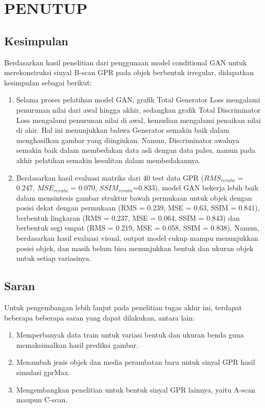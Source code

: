 \chapter{PENUTUP}
\label{chap:penutup}


\section{Kesimpulan}
\label{sec:kesimpulan}

Berdasarkan hasil penelitian dari penggunaan model conditional GAN untuk merekonstruksi sinyal B-scan GPR pada objek berbentuk irregular, didapatkan kesimpulan sebagai berikut:

\begin{enumerate}[nolistsep]

  \item Selama proses pelatihan model GAN, grafik Total Generator Loss mengalami penurunan nilai dari awal hingga akhir, sedangkan grafik Total Discriminator Loss mengalami penurunan nilai di awal, kemudian mengalami penaikan nilai di ahir. 
  Hal ini menunjukkan bahwa Generator semakin baik dalam menghasilkan gambar yang diinginkan. Namun, Discriminator awalnya semakin baik dalam membedakan data asli dengan data palsu, namun pada akhir pelatihan semakin kesulitan dalam membedakannya.

  \item Berdasarkan hasil evaluasi matriks dari 40 test data GPR ($RMS_{rerata}$ = 0.247, $MSE_{rerata}$ = 0.070, $SSIM_{rerata}$=0.833), model GAN bekerja lebih baik dalam mensintesis gambar struktur bawah permukaan untuk objek dengan posisi dekat dengan permukaan (RMS = 0.239, MSE = 0.63, SSIM = 0.841), berbentuk lingkaran (RMS = 0.237, MSE = 0.064, SSIM = 0.843) dan berbentuk segi empat (RMS = 0.219, MSE = 0.058, SSIM = 0.838).
  Namun, berdasarkan hasil evaluasi visual, output model cukup mampu menunjukkan posisi objek, dan masih belum bisa menunjukkan bentuk dan ukuran objek untuk setiap variasinya.

\end{enumerate}

\section{Saran}
\label{chap:saran}

Untuk pengembangan lebih lanjut pada penelitian tugas akhir ini, terdapat beberapa beberapa saran yang dapat dilakukan, antara lain:

\begin{enumerate}[nolistsep]

  \item Memperbanyak data train untuk variasi bentuk dan ukuran benda guna memaksimalkan hasil prediksi gambar.

  \item Menambah jenis objek dan media perambatan baru untuk sinyal GPR hasil simulasi gprMax.

  \item Mengembangkan penelitian untuk bentuk sinyal GPR lainnya, yaitu A-scan maupun C-scan.

\end{enumerate}
